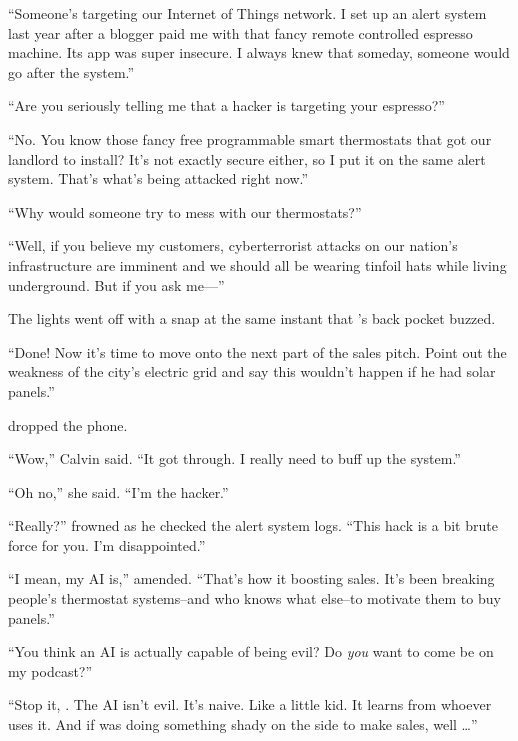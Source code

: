``Someone's targeting our Internet of Things network. I set up an alert system last year after a blogger paid me with that fancy remote controlled espresso machine. Its app was super insecure. I always knew that someday, someone would go after the system.''

``Are you seriously telling me that a hacker is targeting your espresso?''

``No. You know those fancy free programmable smart thermostats that \crunchyCity{} got our landlord to install? It's not exactly secure either, so I put it on the same alert system. That's what's being attacked right now.''

``Why would someone try to mess with our thermostats?''

``Well, if you believe my customers, cyberterrorist attacks on our nation's infrastructure are imminent and we should all be wearing tinfoil hats while living underground. But if you ask me---''

The lights went off with a snap at the same instant that {\protag}'s back pocket buzzed.

``Done! Now it's time to move onto the next part of the sales pitch. Point out the weakness of the city's electric grid and say this wouldn't happen if he had solar panels.''

{\protag} dropped the phone.

``Wow,'' Calvin said. ``It got through. I really need to buff up the system.''

``Oh no,'' she said. ``I'm the hacker.''

``Really?'' {\sidetag} frowned as he checked the alert system logs. ``This hack is a bit brute force for you. I'm disappointed.''


``I mean, my AI is,'' {\protag} amended. ``That's how it boosting sales. It's been breaking people's thermostat systems--and who knows what else--to motivate them to buy panels.''

``You think an AI is actually capable of being evil? Do \emph{you} want to come be on my podcast?''

``Stop it, {\sidetag}. The AI isn't evil. It's naive. Like a little kid. It learns from whoever uses it. And if {\energyJerk} was doing something shady on the side to make sales, well \dots ''

